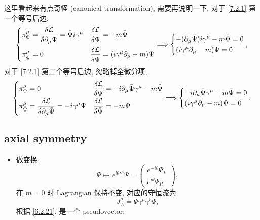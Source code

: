 \begin{itemize}
\begin{tcolorbox}[title=calculation:]
		这里看起来有点奇怪 (canonical transformation), 需要再说明一下. 对于 \eqref{7.2.1} 第一个等号后边,
		\begin{equation}
			\begin{dcases}
				\pi_\Psi^\mu = \frac{\delta \mathcal{L}}{\delta \partial_\mu \Psi} = \bar{\Psi} i \gamma^\mu & \frac{\delta \mathcal{L}}{\delta \Psi} = - m \bar{\Psi} \\
				\pi_{\bar{\Psi}}^\mu = 0 & \frac{\delta \mathcal{L}}{\delta \bar{\Psi}} = (i \gamma^\mu \partial_\mu - m) \Psi
			\end{dcases} \Longrightarrow \begin{dcases}
				- (\partial_\mu \bar{\Psi}) i \gamma^\mu - m \bar{\Psi} = 0 \\
				(i \gamma^\mu \partial_\mu - m) \Psi = 0
			\end{dcases},
		\end{equation}
		对于 \eqref{7.2.1} 第二个等号后边, 忽略掉全微分项,
		\begin{equation}
			\begin{dcases}
				\pi_\Psi^\mu = 0 & \frac{\delta \mathcal{L}}{\delta \Psi} = - i \partial_\mu \bar{\Psi} \gamma^\mu - m \bar{\Psi} \\
				\pi_{\bar{\Psi}}^\mu = \frac{\delta \mathcal{L}}{\delta \partial_\mu \bar{\Psi}} = - i \gamma^\mu \Psi & \frac{\delta \mathcal{L}}{\delta \bar{\Psi}} = - m \Psi
			\end{dcases} \Longrightarrow \begin{dcases}
				- i \partial_\mu \bar{\Psi} \gamma^\mu - m \bar{\Psi} = 0 \\
				(i \gamma^\mu \partial_\mu - m) \Psi = 0
			\end{dcases}.
		\end{equation}
	\end{tcolorbox}
\end{itemize}

\subsection{axial symmetry}
\begin{itemize}
	\item 做变换
	\begin{equation}
		\Psi \mapsto e^{i \theta \gamma^5} \Psi = \begin{pmatrix}
			e^{- i \theta} \Psi_L \\
			e^{i \theta} \Psi_R
		\end{pmatrix},
	\end{equation}
	在 $m = 0$ 时 Lagrangian 保持不变, 对应的守恒流为
	\begin{equation}
		J_A^\mu = \bar{\Psi} \gamma^\mu \gamma^5 \Psi,
	\end{equation}
	根据 \eqref{6.2.21}, 是一个 pseudovector.
\end{itemize}

